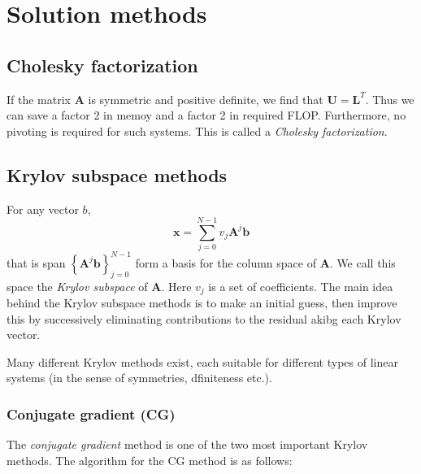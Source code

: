 
\section{Solution methods} %
\label{sec:solution_methods}

\subsection{Cholesky factorization} %
\label{sub:banded_cholesky}

If the matrix $\mathbf{A}$ is symmetric and positive definite, we find that $\mathbf{U}=\mathbf{L}^T$. Thus we can save a factor 2 in memoy and a factor 2 in required FLOP. Furthermore, no pivoting is required for such systems. This is called a \emph{Cholesky factorization}.



\subsection{Krylov subspace methods} %
\label{sub:krylov_subspace_methods}
For any vector $b$,
\begin{equation}
  \mathbf{x} = \sum_{j=0}^{N-1} v_j \mathbf{A}^j \mathbf{b}
\end{equation}
that is span $\left\{ \mathbf{A}^j \mathbf{b} \right\}_{j=0}^{N-1}$ form a basis for the column space of $\mathbf{A}$. We call this space the \emph{Krylov subspace} of $\mathbf{A}$. Here $v_j$ is a set of coefficients. The main idea behind the Krylov subspace methods is to make an initial guess, then improve this by successively  eliminating contributions to the residual akibg each Krylov vector.

Many different Krylov methods exist, each suitable for different types of linear systems (in the sense of symmetries, dfiniteness etc.).

\subsubsection{Conjugate gradient (CG)} %
\label{ssub:conjugate_gradient}

The \emph{conjugate gradient} method is one of the two most important Krylov methods. The algorithm for the CG method is as follows:

